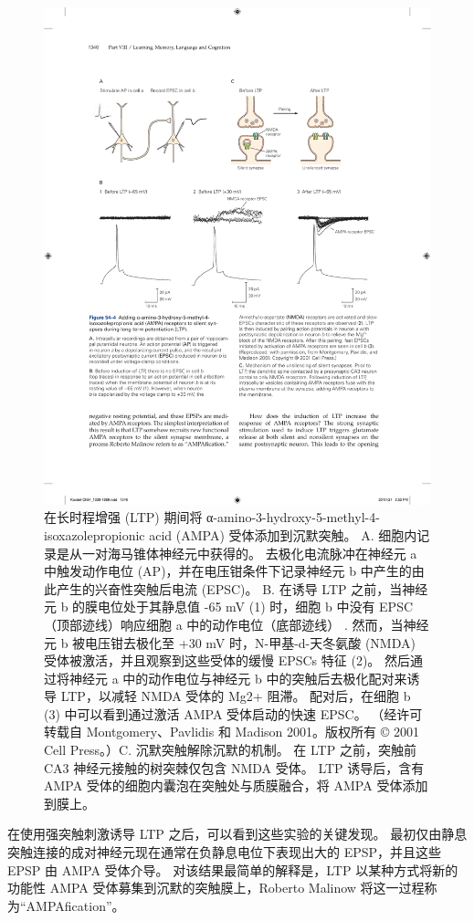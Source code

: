 \begin{figure}[htbp]
	\centering
	\includegraphics[width=0.85\linewidth]{chap54/fig_54_4}
	\caption{在长时程增强 (LTP) 期间将 α-amino-3-hydroxy-5-methyl-4-isoxazolepropionic acid (AMPA) 受体添加到沉默突触。 A. 细胞内记录是从一对海马锥体神经元中获得的。 去极化电流脉冲在神经元 a 中触发动作电位 (AP)，并在电压钳条件下记录神经元 b 中产生的由此产生的兴奋性突触后电流 (EPSC)。 B. 在诱导 LTP 之前，当神经元 b 的膜电位处于其静息值 -65 mV (1) 时，细胞 b 中没有 EPSC（顶部迹线）响应细胞 a 中的动作电位（底部迹线） . 然而，当神经元 b 被电压钳去极化至 +30 mV 时，N-甲基-d-天冬氨酸 (NMDA) 受体被激活，并且观察到这些受体的缓慢 EPSCs 特征 (2)。 然后通过将神经元 a 中的动作电位与神经元 b 中的突触后去极化配对来诱导 LTP，以减轻 NMDA 受体的 Mg2+ 阻滞。 配对后，在细胞 b (3) 中可以看到通过激活 AMPA 受体启动的快速 EPSC。 （经许可转载自 Montgomery、Pavlidis 和 Madison 2001。版权所有 © 2001 Cell Press。）C. 沉默突触解除沉默的机制。 在 LTP 之前，突触前 CA3 神经元接触的树突棘仅包含 NMDA 受体。 LTP 诱导后，含有 AMPA 受体的细胞内囊泡在突触处与质膜融合，将 AMPA 受体添加到膜上。}
	\label{fig:54_4}
\end{figure}


在使用强突触刺激诱导 LTP 之后，可以看到这些实验的关键发现。
最初仅由静息突触连接的成对神经元现在通常在负静息电位下表现出大的 EPSP，并且这些 EPSP 由 AMPA 受体介导。
对该结果最简单的解释是，LTP 以某种方式将新的功能性 AMPA 受体募集到沉默的突触膜上，Roberto Malinow 将这一过程称为“AMPAfication”。


